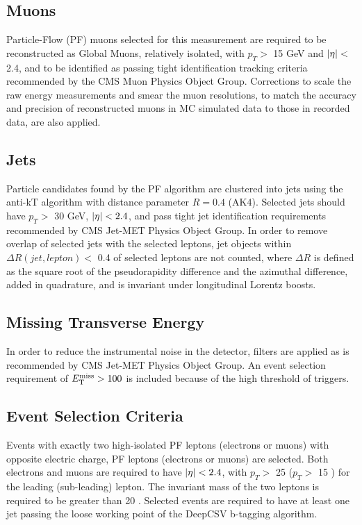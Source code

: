 \subsection{Muons}
Particle-Flow (PF) muons selected for this measurement are required to be reconstructed as Global Muons, relatively isolated, with $p_{T}>$ 15 GeV and $\left\vert\eta\right\vert<$ 2.4, and to be identified as passing tight identification tracking criteria recommended by the CMS Muon Physics Object Group.
Corrections to scale the raw energy measurements and smear the muon resolutions, to match the accuracy and precision of reconstructed muons in MC simulated data to those in recorded data, are also applied.
\subsection{Jets}
Particle candidates found by the PF algorithm are clustered into jets using the anti-kT algorithm with distance parameter $R = 0.4$ (AK4). 
Selected jets should have $p_{T} >$ 30 GeV, $\left\vert\eta\right\vert <2.4$, and pass tight jet identification requirements recommended by CMS Jet-MET Physics Object Group.
In order to remove overlap of selected jets with the selected leptons, jet objects within $\Delta R(jet,lepton)<$ 0.4 of selected leptons are not counted, where $\Delta R$ is defined as the square root of the pseudorapidity difference and the azimuthal difference, added in quadrature, and is invariant under longitudinal Lorentz boosts.
\subsection{Missing Transverse Energy}
In order to reduce the instrumental noise in the detector, \MET filters are applied as is recommended by CMS Jet-MET Physics Object Group.
An event selection requirement of $E_{\mathrm{T}}^{\text{miss}} > 100$ is included because of the high threshold of \MET triggers.
\subsection{Event Selection Criteria}
Events with exactly two high-\pT isolated PF leptons (electrons or muons) with opposite electric charge, PF leptons (electrons or muons) are selected. 
Both electrons and muons are required to have $\left\vert\eta\right\vert < 2.4$, with $p_{T} >$ 25 \GeV ($p_{T} >$ 15 \GeV) for the leading (sub-leading) lepton.  
The invariant mass of the two leptons is required to be greater than 20 \GeV.  
Selected events are required to have at least one jet passing the loose working point of the DeepCSV b-tagging algorithm.

